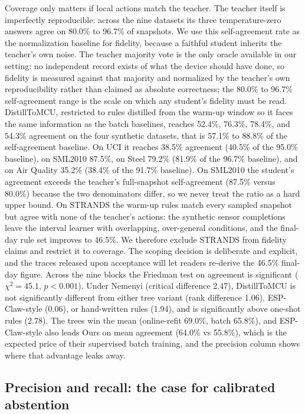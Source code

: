 \documentclass[review]{elsarticle}
\begin{document}
Coverage only matters if local actions match the teacher. The teacher itself
is imperfectly reproducible: across the nine datasets its three
temperature-zero answers agree on 80.0\% to 96.7\% of snapshots. We use this
self-agreement rate as the normalization baseline for fidelity, because a
faithful student inherits the teacher's own noise. The teacher majority vote
is the only oracle available in our setting: no independent record exists of
what the device should have done, so fidelity is measured against that
majority and normalized by the teacher's own reproducibility rather than
claimed as absolute correctness; the 80.0\% to 96.7\% self-agreement range is
the scale on which any student's fidelity must be read. DistillToMCU, restricted
to rules distilled from the warm-up window so it faces the same information
as the batch baselines, reaches 52.4\%, 76.3\%, 78.4\%, and 54.3\% agreement
on the four synthetic datasets, that is 57.1\% to 88.8\% of the
self-agreement baseline. On UCI it reaches 38.5\% agreement (40.5\% of the
95.0\% baseline), on SML2010 87.5\%, on Steel 79.2\% (81.9\% of the 96.7\%
baseline), and on Air Quality 35.2\% (38.4\% of the 91.7\% baseline). On
SML2010 the student's agreement exceeds the teacher's full-snapshot
self-agreement (87.5\% versus 80.0\%) because the two denominators differ, so
we never treat the ratio as a hard upper bound. On STRANDS the warm-up rules
match every sampled snapshot but agree with none of the teacher's actions:
the synthetic sensor completions leave the interval learner with overlapping,
over-general conditions, and the final-day rule set improves to 46.5\%. We
therefore exclude STRANDS from fidelity claims and restrict it to coverage.
The scoping decision is deliberate and explicit, and the traces released upon
acceptance will let readers re-derive the 46.5\% final-day figure. Across the
nine blocks the Friedman test on agreement is significant ($\chi^2 = 45.1$,
$p < 0.001$). Under Nemenyi (critical difference 2.47), DistillToMCU is not
significantly different from either tree variant (rank difference 1.06),
ESP-Claw-style (0.06), or hand-written rules (1.94), and is significantly
above one-shot rules (2.78). The trees win the mean (online-refit 69.0\%,
batch 65.8\%), and ESP-Claw-style also leads Ours on mean agreement (64.0\%
vs 55.8\%), which is the expected price of their supervised batch training,
and the precision column shows where that advantage leaks away.

\subsection{Precision and recall: the case for calibrated abstention}
\end{document}
